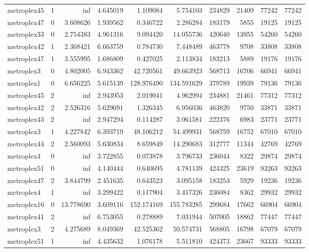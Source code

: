 \begin{longtable}{|l|r|r|r|r|r|r|r|r|r|}
metroplex45 & 1 & inf & 4.645019 & 1.109084 & 5.754103 & 234829 & 21409 & 77242 & 77242 \\
metroplex47 & 0 & 3.608626 & 1.939562 & 0.346722 & 2.286284 & 183179 & 5855 & 19125 & 19125 \\
metroplex33 & 0 & 2.754383 & 4.961316 & 9.094420 & 14.055736 & 420640 & 13955 & 54260 & 54260 \\
metroplex42 & 1 & 2.368421 & 6.663759 & 0.784730 & 7.448489 & 463778 & 9708 & 33808 & 33808 \\
metroplex47 & 1 & 3.555995 & 1.686809 & 0.427025 & 2.113834 & 183213 & 5889 & 19176 & 19176 \\
metroplex3 & 0 & 4.802005 & 6.943362 & 42.720561 & 49.663923 & 568713 & 16706 & 66941 & 66941 \\
metroplex1 & 0 & 6.656225 & 5.615139 & 128.976490 & 134.591629 & 379789 & 19939 & 79136 & 79136 \\
metroplex45 & 2 & inf & 2.943953 & 2.019041 & 4.962994 & 234881 & 21461 & 77312 & 77312 \\
metroplex42 & 2 & 2.526316 & 5.629691 & 1.326345 & 6.956036 & 463820 & 9750 & 33871 & 33871 \\
metroplex43 & 2 & inf & 2.947294 & 0.114287 & 3.061581 & 222376 & 6983 & 23771 & 23771 \\
metroplex3 & 1 & 4.227842 & 6.393719 & 48.106212 & 54.499931 & 568759 & 16752 & 67010 & 67010 \\
metroplex44 & 2 & 2.560093 & 5.630834 & 8.659849 & 14.290683 & 312777 & 11344 & 42769 & 42769 \\
metroplex4 & 0 & inf & 3.722855 & 0.073878 & 3.796733 & 236044 & 8322 & 29874 & 29874 \\
metroplex51 & 0 & inf & 4.140444 & 0.640695 & 4.781139 & 424325 & 23619 & 93263 & 93263 \\
metroplex47 & 2 & 3.844799 & 2.451635 & 0.643523 & 3.095158 & 183253 & 5929 & 19236 & 19236 \\
metroplex4 & 1 & inf & 3.299422 & 0.117904 & 3.417326 & 236084 & 8362 & 29932 & 29932 \\
metroplex16 & 0 & 13.778690 & 3.609116 & 152.174169 & 155.783285 & 299684 & 17662 & 66904 & 66904 \\
metroplex41 & 2 & inf & 6.753055 & 0.278889 & 7.031944 & 507005 & 18862 & 77447 & 77447 \\
metroplex3 & 2 & 4.275689 & 8.049369 & 42.525362 & 50.574731 & 568805 & 16798 & 67079 & 67079 \\
metroplex51 & 1 & inf & 4.435632 & 1.076178 & 5.511810 & 424373 & 23667 & 93333 & 93333 \\

\end{longtable}
